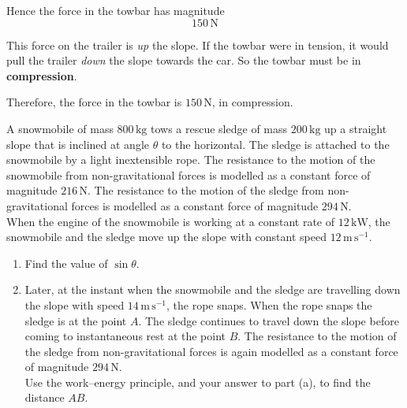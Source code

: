 \documentclass[leqno]{article}
\begin{document}
\begin{enumerate}[
  label=\textbf{\arabic*.},
  leftmargin=*,
  topsep=0pt,
  partopsep=0pt,
  parsep=0pt
]
\begin{djsSolution}
Hence the force in the towbar has magnitude
\[
150\,\mathrm{N}
\]

This force on the trailer is \emph{up} the slope. If the towbar were in tension, it would pull the trailer \emph{down} the slope towards the car. So the towbar must be in \textbf{compression}.

Therefore, the force in the towbar is $150\,\mathrm{N}$, in compression.
\end{djsSolution}


\newpage

\questionitem

A snowmobile of mass $800\,\mathrm{kg}$ tows a rescue sledge of mass $200\,\mathrm{kg}$ up a straight slope that is inclined at angle $\theta$ to the horizontal. The sledge is attached to the snowmobile by a light inextensible rope. The resistance to the motion of the snowmobile from non-gravitational forces is modelled as a constant force of magnitude $216\,\mathrm{N}$. The resistance to the motion of the sledge from non-gravitational forces is modelled as a constant force of magnitude $294\,\mathrm{N}$. \\

When the engine of the snowmobile is working at a constant rate of $12\,\mathrm{kW}$, the snowmobile and the sledge move up the slope with constant speed $12\,\mathrm{m\,s^{-1}}$. \\

\begin{enumerate}[label=\textbf{(\alph*)}]
  \item Find the value of $\sin\theta$.  \\
  \item Later, at the instant when the snowmobile and the sledge are travelling down the slope with speed $14\,\mathrm{m\,s^{-1}}$, the rope snaps. When the rope snaps the sledge is at the point $A$. The sledge continues to travel down the slope before coming to instantaneous rest at the point $B$. The resistance to the motion of the sledge from non-gravitational forces is again modelled as a constant force of magnitude $294\,\mathrm{N}$. \\

  Use the work--energy principle, and your answer to part (a), to find the distance $AB$.  \\
\end{enumerate}

\vspace*{10pt}


\end{enumerate}
\end{document}
